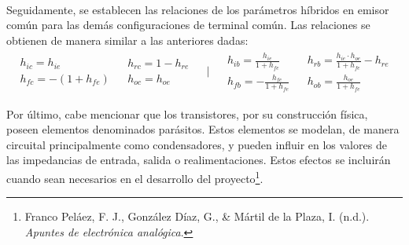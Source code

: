 \paragraph{}
Seguidamente, se establecen las relaciones de los parámetros híbridos en emisor com\'un para las demás configuraciones de terminal común. Las relaciones se obtienen de manera similar a las anteriores dadas:
   \begin{equation} \label{eq:h_conversion}
\begin{array}{rrcll} 
      \begin{array}{l}
	 h_{ic} = h_{ie} \\
	 h_{fc} = - (1+ h_{fe} )
      \end{array}
      &
      \begin{array}{l}
	 h_{rc} = 1 - h_{re} \\
	 h_{oc} = h_{oe}
      \end{array}
      &
      \begin{array}{l}
	 \bigg|
      \end{array}
      &
      \begin{array}{l}
	 h_{ib} = \frac{h_{ie}}{1+h_{fe}} \\
	 h_{fb} = -\frac{h_{fe}}{1+h_{fe}} 
      \end{array}
      &
      \begin{array}{l}
	 h_{rb} = \frac{h_{ie} \cdot h_{oe}}{1+h_{fe}} - h_{re}\\
	 h_{ob} = \frac{h_{oe}}{1+h_{fe}} 
      \end{array}
\end{array}
   \end{equation}

Por último, cabe mencionar que los transistores, por su construcción física, poseen elementos denominados parásitos. Estos elementos se modelan, de manera circuital principalmente como condensadores, y pueden influir en los valores de las impedancias de entrada, salida o realimentaciones. Estos efectos se incluirán cuando sean necesarios en el desarrollo del proyecto\footnote{Franco Peláez, F. J., González Díaz, G., \& Mártil de la Plaza, I. (n.d.). \textit{Apuntes de electrónica analógica}.}.
